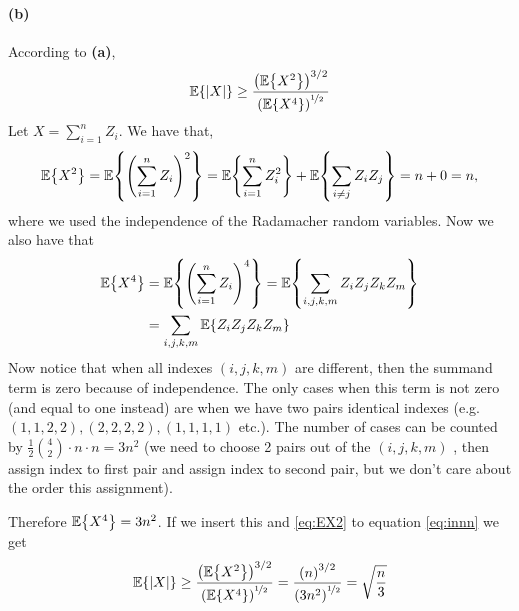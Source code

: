 \documentclass{article}
\DeclarePairedDelimiter\br{(}{)}%
\DeclarePairedDelimiter\brc{\{}{\}}%
\DeclarePairedDelimiter\abs{\lvert}{\rvert}%
\newcommand{\E}{\mathbb{E}}
\begin{document}
\paragraph{(b)}
According to \textbf{(a)},
\begin{align} \label{eq:innn}
    \E\brc*{\abs{X}} \geq    \frac{\br*{ \E \brc*{X^2} }^{3/2}}{\br*{\E\brc*{X^4}}^{\nicefrac{1}{2}}}
\end{align}
Let $X = \sum_{i=1}^{n} Z_i$. 
We have that,
\begin{align} \label{eq:EX2}
    \E\brc*{X^2} = \E\brc*{\br*{\sum_{i=1}^{n} Z_i}^2} 
    = \E\brc*{\sum_{i=1}^{n} Z_i^2} + \E\brc*{\sum_{i \neq j} Z_i Z_j} = n + 0 = n,
\end{align}
where we used the independence of the  Radamacher random variables.
Now we also have that
\begin{align*} 
    \E\brc*{X^4}  &= \E\brc*{\br*{\sum_{i=1}^{n} Z_i}^4} 
  = \E\brc*{\sum_{i,j,k,m}  Z_i Z_j Z_k Z_m} \\
   &= \sum_{i,j,k,m}  \E\brc*{Z_i Z_j Z_k Z_m}
\end{align*}
Now notice that when all indexes $(i,j,k,m)$ are different, then the summand  term is zero because of independence.
The only cases when this term is not zero (and equal to one instead) are when we have two pairs identical indexes (e.g. $(1,1,2,2), (2,2,2,2), (1,1,1,1)$ etc.).
The number of cases can be counted by $\frac{1}{2} {4 \choose 2} \cdot n \cdot n= 3 n^2$ (we need to choose 2 pairs out of the $(i,j,k,m)$ , then assign index to first pair and assign index to second pair, but we don't care about the order this assignment).

Therefore $\E\brc*{X^4} = 3 n^2$.
If we insert this and \ref{eq:EX2} to equation \ref{eq:innn}  we get 
\begin{align} 
    \E\brc*{\abs{X}} \geq    \frac{\br*{ \E \brc*{X^2} }^{3/2}}{\br*{\E\brc*{X^4}}^{\nicefrac{1}{2}}} 
    =  \frac{\br*{ n }^{3/2}}{\br*{3n^2}^{\nicefrac{1}{2}}} 
    = \sqrt{\frac{n}{3}}
\end{align}



\end{document}
